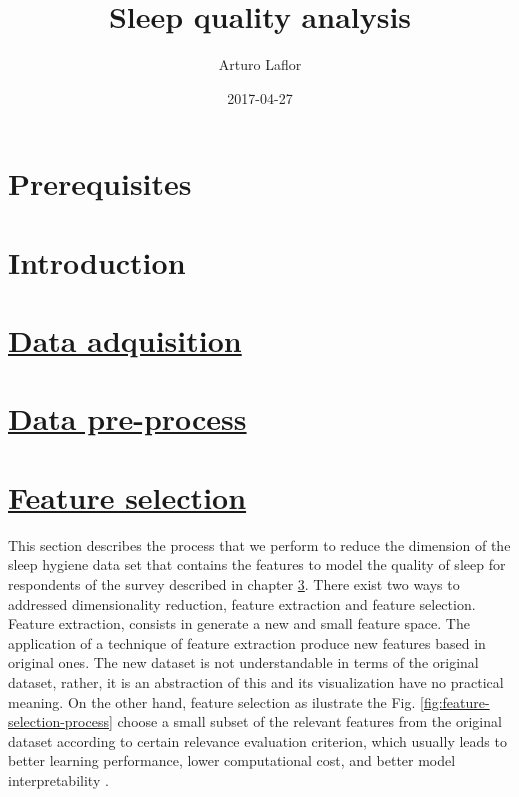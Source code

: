 \documentclass[]{book}
\title{Sleep quality analysis}
\author{Arturo Laflor}
\date{2017-04-27}
\begin{document}
\maketitle

{
\setcounter{tocdepth}{1}
\tableofcontents
}
\chapter{Prerequisites}\label{prerequisites}

\chapter{Introduction}\label{intro}

\hypertarget{data-adquisition}{\chapter{\texorpdfstring{\protect\hyperlink{data-adquisition}{Data
adquisition}}{Data adquisition}}\label{data-adquisition}}

\chapter{\texorpdfstring{\protect\hyperlink{data-preprocess}{Data
pre-process}}{Data pre-process}}\label{data-pre-process}

\hypertarget{feature-selection}{\chapter{\texorpdfstring{\protect\hyperlink{feature-selection}{Feature
selection}}{Feature selection}}\label{feature-selection}}

This section describes the process that we perform to reduce the
dimension of the sleep hygiene data set that contains the features to
model the quality of sleep for respondents of the survey described in
chapter \ref{data-adquisition}. There exist two ways to addressed
dimensionality reduction, feature extraction and feature selection.
Feature extraction, consists in generate a new and small feature space.
The application of a technique of feature extraction produce new
features based in original ones. The new dataset is not understandable
in terms of the original dataset, rather, it is an abstraction of this
and its visualization have no practical meaning. On the other hand,
feature selection as ilustrate the Fig.
\ref{fig:feature-selection-process} choose a small subset of the
relevant features from the original dataset according to certain
relevance evaluation criterion, which usually leads to better learning
performance, lower computational cost, and better model interpretability
\citep{Tang2014}.
\end{document}

